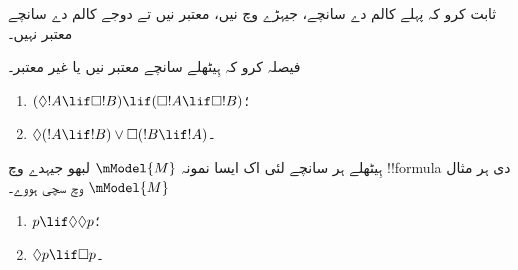 \documentclass[../../../include/open-logic-section]{subfiles}
\begin{document}
\begin{prob}%
  ثابت کرو کہ پہلے کالم دے سانچے، جیہڑے  وچ نیں، معتبر نیں تے دوجے کالم دے سانچے معتبر نہیں۔
\end{prob}

\begin{prob}
  فیصلہ کرو کہ ہِیٹھلے سانچے معتبر نیں یا غیر معتبر۔
  \begin{enumerate}
  \item $(\Diamond !A \lif \Box !B) \lif (\Box !A \lif \Box
    !B)$؛
  \item $\Diamond(!A \lif !B) \lor \Box(!B \lif !A)$۔
  \end{enumerate}
\end{prob}

\begin{prob}
  ہِیٹھلے ہر سانچے لئی اک ایسا نمونہ $\mModel{M}$ لبھو جیہدے وچ !!{formula} دی ہر مثال $\mModel{M}$ وچ سچی ہووے۔
  \begin{enumerate}
  \item $p \lif \Diamond\Diamond p$؛
  \item $\Diamond p \lif \Box p$۔
  \end{enumerate}
\end{prob}
\end{document}
